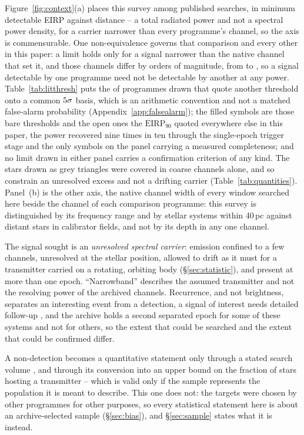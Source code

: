 Figure~\ref{fig:context}(a) places this survey among published searches, in
minimum detectable EIRP against distance -- a total radiated power and not a
spectral power density, for a carrier narrower than every programme's channel,
so the axis is commensurable. One non-equivalence governs that comparison and
every other in this paper: a limit holds only for a signal narrower than the
native channel that set it, and those channels differ by \LtChanSpanDex{}
orders of magnitude, from \LtChanNarrow{} to \LtChanWide, so a signal
detectable by one programme need not be detectable by another at any
power. Table~\ref{tab:litthresh} puts the \LtNRescaled{} of \LtNProg{}
programmes drawn that quote another threshold onto a common
$5\sigma$ basis, which is an arithmetic convention and not a matched
false-alarm probability (Appendix~\ref{app:falsealarm}); the filled symbols are
those bare thresholds and the open ones the $\mathrm{EIRP}_{90}$ quoted
everywhere else in this paper, the power recovered nine times in ten through
the single-epoch trigger stage and the only symbols on the panel carrying a
measured completeness; and no limit drawn in either panel carries a
confirmation criterion of any kind. The \NgNDecBOnly{} stars drawn as grey
triangles were covered in coarse channels alone, and so constrain an unresolved
excess and not a drifting carrier (Table~\ref{tab:quantities}). Panel~(b) is
the other axis, the native channel width of every window searched here beside
the channel of each comparison programme: this survey is distinguished by its
frequency range and by \NSysClassA{} stellar systems within 40\,pc against
distant stars in \MasonNCal{} calibrator fields, and not by its depth in any
one channel.

The signal sought is an \emph{unresolved spectral carrier}: emission confined
to a few channels, unresolved at the stellar position, allowed to drift as it
must for a transmitter carried on a rotating, orbiting body
(\S\ref{sec:statistic}), and present at more than one epoch. ``Narrowband''
describes the assumed transmitter and not the resolving power of the archived
channels. Recurrence, and not brightness, separates an interesting event from a
detection, a signal of interest needs detailed follow-up \citep{Sheikh2021},
and the archive holds a second separated epoch for some of these systems and
not for others, so the extent that could be searched and the extent that could
be confirmed differ.

A non-detection becomes a quantitative statement only through a stated search
volume \citep{Wright2018}, and through its conversion into an upper bound on
the fraction of stars hosting a transmitter
\citep{Margot2023,EarthDetectingEarth2025} -- which is valid only if the sample
represents the population it is meant to describe. This one does not: the
targets were chosen by other programmes for other purposes, so every
statistical statement here is about an archive-selected sample
(\S\ref{sec:bias}), and \S\ref{sec:sample} states what it is instead.

